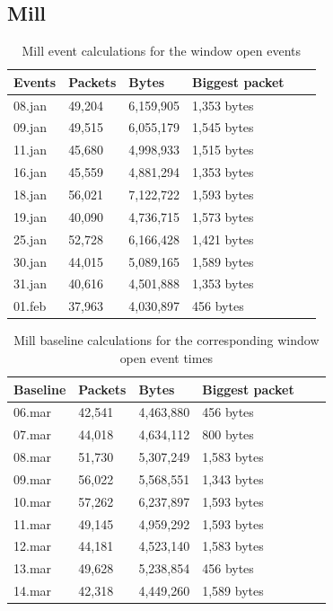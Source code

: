 \newpage
\subsection{Mill}

\begin{table}[H]
    \centering
    \caption{Mill event calculations for the window open events}
    \begin{tabular}{|l|l|l|l|l|l|}
    \hline
        \textbf{Events} & \textbf{Packets} & \textbf{Bytes} & \textbf{Biggest packet} \\ \hline
        08.jan & 49,204 & 6,159,905 & 1,353 bytes   \\ \hline
        09.jan & 49,515 & 6,055,179 & 1,545 bytes   \\ \hline
        11.jan & 45,680 & 4,998,933 & 1,515 bytes   \\ \hline
        16.jan & 45,559 & 4,881,294 & 1,353 bytes \\ \hline
        18.jan & 56,021 & 7,122,722 & 1,593 bytes   \\ \hline
        19.jan & 40,090 & 4,736,715 & 1,573 bytes \\ \hline
        25.jan & 52,728 & 6,166,428 & 1,421 bytes \\ \hline
        30.jan & 44,015 & 5,089,165 & 1,589 bytes  \\ \hline
        31.jan & 40,616 & 4,501,888 & 1,353 bytes \\ \hline
        01.feb & 37,963 & 4,030,897 & 456 bytes \\ \hline
    \end{tabular}
    \label{tab:MillWindowCalculations}
\end{table}

\begin{table}[H]
    \centering
    \caption{Mill baseline calculations for the corresponding window open event times}
    \begin{tabular}{|l|l|l|l|l|l|}
    \hline
        \textbf{Baseline} & \textbf{Packets} & \textbf{Bytes} & \textbf{Biggest packet} \\ \hline
        06.mar & 42,541 & 4,463,880 & 456 bytes \\ \hline
        07.mar & 44,018 & 4,634,112 & 800 bytes \\ \hline
        08.mar & 51,730 & 5,307,249 & 1,583 bytes \\ \hline
        09.mar & 56,022 & 5,568,551 & 1,343 bytes \\ \hline
        10.mar & 57,262 & 6,237,897 & 1,593 bytes \\ \hline
        11.mar & 49,145 & 4,959,292 & 1,593 bytes \\ \hline
        12.mar & 44,181 & 4,523,140 & 1,583 bytes \\ \hline
        13.mar & 49,628 & 5,238,854 & 456 bytes \\ \hline
        14.mar & 42,318 & 4,449,260 & 1,589 bytes \\ \hline
    \end{tabular}
    \label{tab:MillBaselineWindowCalculations}
\end{table}

